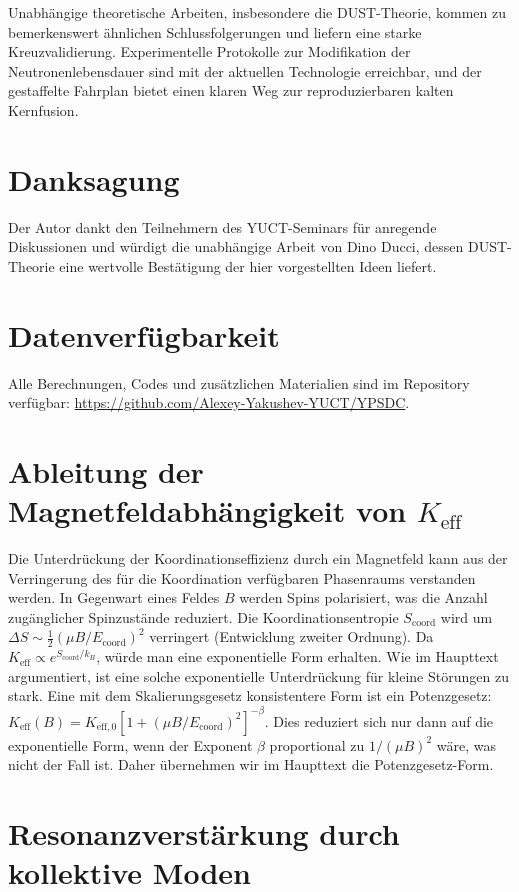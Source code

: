 \documentclass[12pt]{article}
\theoremstyle{remark}
\newcommand{\Keff}{K_{\mathrm{eff}}}
\newcommand{\Keffzero}{K_{\mathrm{eff},0}}
\begin{document}
	Unabhängige theoretische Arbeiten, insbesondere die DUST-Theorie, kommen zu bemerkenswert ähnlichen Schlussfolgerungen und liefern eine starke Kreuzvalidierung. Experimentelle Protokolle zur Modifikation der Neutronenlebensdauer sind mit der aktuellen Technologie erreichbar, und der gestaffelte Fahrplan bietet einen klaren Weg zur reproduzierbaren kalten Kernfusion.
	
	\section*{Danksagung}
	Der Autor dankt den Teilnehmern des YUCT-Seminars für anregende Diskussionen und würdigt die unabhängige Arbeit von Dino Ducci, dessen DUST-Theorie eine wertvolle Bestätigung der hier vorgestellten Ideen liefert.
	
	\section*{Datenverfügbarkeit}
	Alle Berechnungen, Codes und zusätzlichen Materialien sind im Repository verfügbar: \url{https://github.com/Alexey-Yakushev-YUCT/YPSDC}.
	
	\appendix
	\section{Ableitung der Magnetfeldabhängigkeit von \(\Keff\)}
	\label{app:B}
	
	Die Unterdrückung der Koordinationseffizienz durch ein Magnetfeld kann aus der Verringerung des für die Koordination verfügbaren Phasenraums verstanden werden. In Gegenwart eines Feldes \(B\) werden Spins polarisiert, was die Anzahl zugänglicher Spinzustände reduziert. Die Koordinationsentropie \(S_{\text{coord}}\) wird um \(\Delta S \sim \frac{1}{2} (\mu B / E_{\mathrm{coord}})^2\) verringert (Entwicklung zweiter Ordnung). Da \(\Keff \propto e^{S_{\text{coord}}/k_B}\), würde man eine exponentielle Form erhalten. Wie im Haupttext argumentiert, ist eine solche exponentielle Unterdrückung für kleine Störungen zu stark. Eine mit dem Skalierungsgesetz konsistentere Form ist ein Potenzgesetz: \(\Keff(B) = \Keffzero [1 + (\mu B/E_{\mathrm{coord}})^2]^{-\beta}\). Dies reduziert sich nur dann auf die exponentielle Form, wenn der Exponent \(\beta\) proportional zu \(1/(\mu B)^2\) wäre, was nicht der Fall ist. Daher übernehmen wir im Haupttext die Potenzgesetz-Form.
	
	\section{Resonanzverstärkung durch kollektive Moden}
	\label{app:resonance}
	
\end{document}
